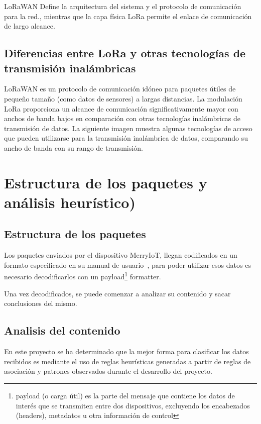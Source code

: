 LoRaWAN Define la arquitectura del sistema y el protocolo de comunicación para la red., mientras que la capa física LoRa permite el enlace de comunicación de largo alcance.


\subsection{Diferencias entre LoRa y otras tecnologías de transmisión inalámbricas}
LoRaWAN es un protocolo de comunicación idóneo para paquetes útiles de pequeño tamaño (como datos de sensores) a largas distancias. La modulación LoRa proporciona un alcance de comunicación significativamente mayor con anchos de banda bajos en comparación con otras tecnologías inalámbricas de transmisión de datos. La siguiente imagen muestra algunas tecnologías de acceso que pueden utilizarse para la transmisión inalámbrica de datos, comparando su ancho de banda con su rango de transmisión.



\section{Estructura de los paquetes y análisis heurístico)}

\subsection{Estructura de los paquetes}
Los paquetes enviados por el dispositivo MerryIoT, llegan codificados en un formato especificado en su manual de usuario~\cite{MerryIoT:manual}, para poder utilizar esos datos es necesario decodificarlos con un payload\footnote{ payload (o carga útil) es la parte del mensaje que contiene los datos de interés que se transmiten entre dos dispositivos, excluyendo los encabezados (headers), metadatos u otra información de control} formatter.


Una vez decodificados, se puede comenzar a analizar su contenido y sacar conclusiones del mismo.

\subsection{Analisis del contenido}
En este proyecto se ha determinado que la mejor forma para clasificar los datos recibidos es mediante el uso de reglas heurísticas generadas a partir de reglas de asociación y patrones observados durante el desarrollo del proyecto.

